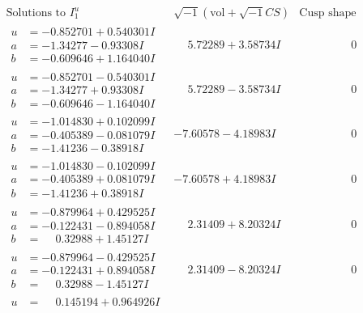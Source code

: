 \documentclass[1p]{elsarticle_modified}
\theoremstyle{definition}
\newcommand{\I}{\sqrt{-1}}
\begin{document}
$$\begin{array}{c|c|c}  
\text{Solutions to }I^u_{1}& \I (\text{vol} + \sqrt{-1}CS) & \text{Cusp shape}\\
 \hline 
\begin{aligned}
u &= -0.852701 + 0.540301 I \\
a &= -1.34277 - 0.93308 I \\
b &= -0.609646 + 1.164040 I\end{aligned}
 & \phantom{-}5.72289 + 3.58734 I & \phantom{-0.000000 } 0 \\ \hline\begin{aligned}
u &= -0.852701 - 0.540301 I \\
a &= -1.34277 + 0.93308 I \\
b &= -0.609646 - 1.164040 I\end{aligned}
 & \phantom{-}5.72289 - 3.58734 I & \phantom{-0.000000 } 0 \\ \hline\begin{aligned}
u &= -1.014830 + 0.102099 I \\
a &= -0.405389 - 0.081079 I \\
b &= -1.41236 - 0.38918 I\end{aligned}
 & -7.60578 - 4.18983 I & \phantom{-0.000000 } 0 \\ \hline\begin{aligned}
u &= -1.014830 - 0.102099 I \\
a &= -0.405389 + 0.081079 I \\
b &= -1.41236 + 0.38918 I\end{aligned}
 & -7.60578 + 4.18983 I & \phantom{-0.000000 } 0 \\ \hline\begin{aligned}
u &= -0.879964 + 0.429525 I \\
a &= -0.122431 - 0.894058 I \\
b &= \phantom{-}0.32988 + 1.45127 I\end{aligned}
 & \phantom{-}2.31409 + 8.20324 I & \phantom{-0.000000 } 0 \\ \hline\begin{aligned}
u &= -0.879964 - 0.429525 I \\
a &= -0.122431 + 0.894058 I \\
b &= \phantom{-}0.32988 - 1.45127 I\end{aligned}
 & \phantom{-}2.31409 - 8.20324 I & \phantom{-0.000000 } 0 \\ \hline\begin{aligned}
u &= \phantom{-}0.145194 + 0.964926 I \\

\end{aligned}
\end{array}$$
\end{document}

